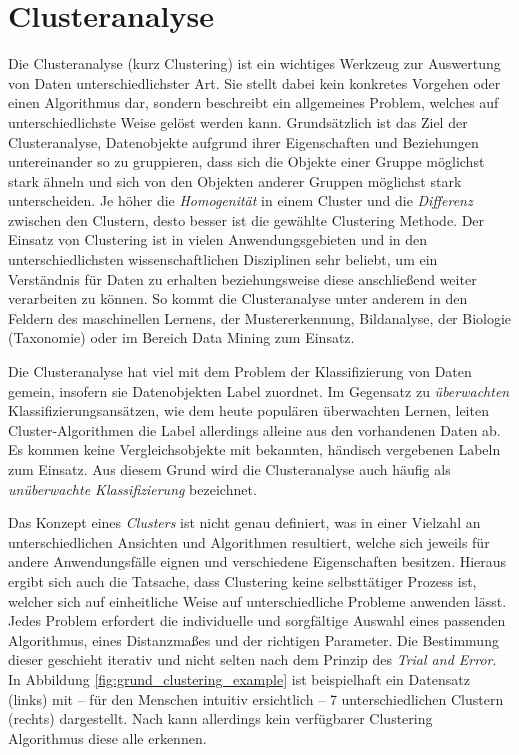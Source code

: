 
\section{Clusteranalyse}
\label{sec:tra_clustering}

Die Clusteranalyse (kurz Clustering) ist ein wichtiges Werkzeug zur Auswertung von Daten unterschiedlichster
Art. Sie stellt dabei kein konkretes Vorgehen oder einen Algorithmus dar, sondern beschreibt ein
allgemeines Problem, welches auf unterschiedlichste Weise gelöst werden kann.
Grundsätzlich ist das Ziel der Clusteranalyse, Datenobjekte aufgrund ihrer Eigenschaften und Beziehungen
untereinander so zu gruppieren, dass sich die Objekte einer Gruppe möglichst stark ähneln und sich
von den Objekten anderer Gruppen möglichst stark unterscheiden. Je höher die \textit{Homogenität} in einem Cluster
und die \textit{Differenz} zwischen den Clustern, desto besser ist die gewählte Clustering Methode.
Der Einsatz von Clustering ist in vielen Anwendungsgebieten und in den unterschiedlichsten wissenschaftlichen
Disziplinen sehr beliebt, um ein Verständnis für Daten zu erhalten beziehungsweise diese anschließend weiter
verarbeiten zu können.
So kommt die Clusteranalyse unter anderem in den Feldern des maschinellen Lernens, der Mustererkennung, Bildanalyse,
der Biologie (Taxonomie) oder im Bereich Data Mining zum Einsatz. \cite[]{tan2007introduction}

Die Clusteranalyse hat viel mit dem Problem der Klassifizierung von Daten gemein, insofern sie Datenobjekten
Label zuordnet. Im Gegensatz zu \textit{überwachten} Klassifizierungsansätzen, wie dem heute populären überwachten
Lernen, leiten Cluster-Algorithmen die Label allerdings alleine aus den vorhandenen Daten ab.
Es kommen keine Vergleichsobjekte mit bekannten, händisch vergebenen Labeln zum Einsatz.
Aus diesem Grund wird die Clusteranalyse auch häufig als \textit{unüberwachte Klassifizierung} bezeichnet. \cite[]{tan2007introduction} 

Das Konzept eines \textit{Clusters} ist nicht genau definiert, was in einer Vielzahl an unterschiedlichen Ansichten
und Algorithmen resultiert, welche sich jeweils für andere Anwendungsfälle eignen und verschiedene Eigenschaften
besitzen. Hieraus ergibt sich auch die Tatsache, dass Clustering keine selbsttätiger Prozess ist, welcher sich auf
einheitliche Weise auf unterschiedliche Probleme anwenden lässt. Jedes Problem erfordert die individuelle und sorgfältige
Auswahl eines passenden Algorithmus, eines Distanzmaßes und der richtigen Parameter. Die Bestimmung dieser geschieht
iterativ und nicht selten nach dem Prinzip des \textit{Trial and Error}. In Abbildung \ref{fig:grund_clustering_example}
ist beispielhaft ein Datensatz (links) mit -- für den Menschen intuitiv ersichtlich -- 7 unterschiedlichen Clustern (rechts)
dargestellt. Nach \cite[]{Jain2010} kann allerdings kein verfügbarer Clustering Algorithmus diese alle erkennen.
\cite[]{Jain1999, tan2007introduction}

